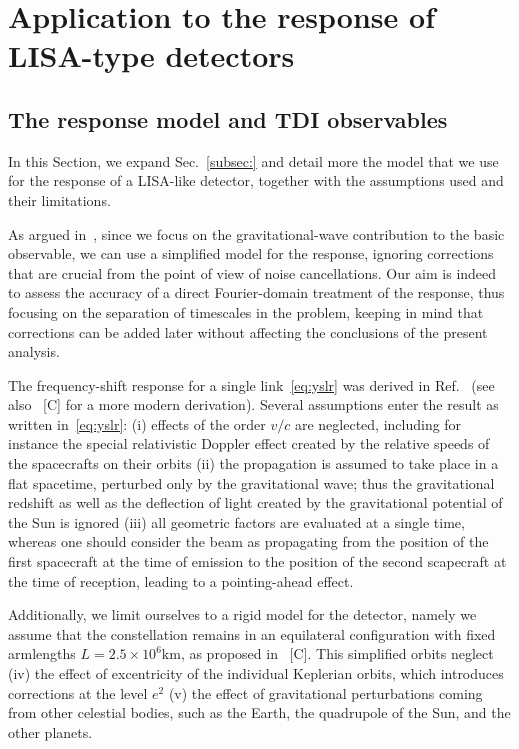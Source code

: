 \documentclass[aps,showpacs,twocolumn,
prd,superscriptaddress,nofootinbib]{revtex4-1}
\newcommand{\SM}[1]{{\color{Red} #1}}
\begin{document}

\section{Application to the response of LISA-type detectors}
\label{sec:LISA}


\subsection{The response model and TDI observables}
\label{subsec:modelLISA}

In this Section, we expand Sec.~\ref{subsec:} and detail more the model that we use for the response of a LISA-like detector, together with the assumptions used and their limitations.

As argued in~\cite{Krolak+04}, since we focus on the gravitational-wave contribution to the basic observable, we can use a simplified model for the response, ignoring corrections that are crucial from the point of view of noise cancellations. Our aim is indeed to assess the accuracy of a direct Fourier-domain treatment of the response, thus focusing on the separation of timescales in the problem, keeping in mind that corrections can be added later without affecting the conclusions of the present analysis.

The frequency-shift response for a single link~\eqref{eq:yslr} was derived in Ref.~\cite{EW75} (see also~\cite{} \SM{[C]} for a more modern derivation). Several assumptions enter the result as written in~\eqref{eq:yslr}: (i) effects of the order $v/c$ are neglected, including for instance the special relativistic Doppler effect created by the relative speeds of the spacecrafts on their orbits (ii) the propagation is assumed to take place in a flat spacetime, perturbed only by the gravitational wave; thus the gravitational redshift as well as the deflection of light created by the gravitational potential of the Sun is ignored (iii) all geometric factors are evaluated at a single time, whereas one should consider the beam as propagating from the position of the first spacecraft at the time of emission to the position of the second scapecraft at the time of reception, leading to a pointing-ahead effect.

Additionally, we limit ourselves to a rigid model for the detector, namely we assume that the constellation remains in an equilateral configuration with fixed armlengths $L=2.5\times 10^{6}\mathrm{km}$, as proposed in~\cite{} \SM{[C]}. This simplified orbits neglect (iv) the effect of excentricity of the individual Keplerian orbits, which introduces corrections at the level $e^{2}$ (v) the effect of gravitational perturbations coming from other celestial bodies, such as the Earth, the quadrupole of the Sun, and the other planets. 
\end{document}
